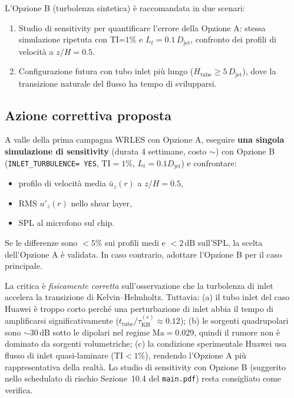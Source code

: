 \documentclass[11pt,a4paper]{article}
\newcommand{\ttcfg}[1]{\texttt{\color{codegray}#1}}
\newcommand{\Djet}{D_{\mathrm{jet}}}
\newcommand{\Ma}{\mathrm{Ma}}
\begin{document}
L'Opzione B (turbolenza sintetica) è raccomandata in due scenari:
\begin{enumerate}
  \item Studio di sensitivity per quantificare l'errore della
    Opzione A: stessa simulazione ripetuta con TI=$1\%$ e
    $L_{t}=0.1\,\Djet$, confronto dei profili di velocità a
    $z/H=0.5$.
  \item Configurazione futura con tubo inlet più lungo
    ($H_{\mathrm{tube}}\geq 5\,\Djet$), dove la transizione naturale
    del flusso ha tempo di svilupparsi.
\end{enumerate}

\subsection{Azione correttiva proposta}

\begin{infobox}
A valle della prima campagna WRLES con Opzione A, eseguire
\textbf{una singola simulazione di sensitivity} (durata 4 settimane,
costo $\sim$) con Opzione B
(\ttcfg{INLET\_TURBULENCE= YES}, $\mathrm{TI}=1\%$,
$L_{t}=0.1\Djet$) e confrontare:
\begin{itemize}
  \item profilo di velocità media $\bar u_{z}(r)$ a $z/H=0.5$,
  \item RMS $u'_{z}(r)$ nello shear layer,
  \item SPL al microfono sul chip.
\end{itemize}
Se le differenze sono $<5\%$ sui profili medi e $<2\,\mathrm{dB}$
sull'SPL, la scelta dell'Opzione A è validata. In caso contrario,
adottare l'Opzione B per il caso principale.
\end{infobox}

\begin{verdettoparz}
La critica è \emph{fisicamente corretta} sull'osservazione che la
turbolenza di inlet accelera la transizione di Kelvin--Helmholtz.
Tuttavia: (a) il tubo inlet del caso Huawei è troppo corto perché
una perturbazione di inlet abbia il tempo di amplificarsi
significativamente ($t_{\mathrm{tube}}/\tau_{\mathrm{KH}}^{(e)}\approx
0.12$); (b) le sorgenti quadrupolari sono $\sim 30\,\mathrm{dB}$
sotto le dipolari nel regime $\Ma=0.029$, quindi il rumore non è
dominato da sorgenti volumetriche; (c) la condizione sperimentale
Huawei usa flusso di inlet quasi-laminare ($\mathrm{TI}<1\%$),
rendendo l'Opzione A più rappresentativa della realtà. Lo studio di
sensitivity con Opzione B (suggerito nello schedulato di rischio
Sezione~10.4 del \texttt{main.pdf}) resta consigliato come
verifica.
\end{verdettoparz}
\end{document}
